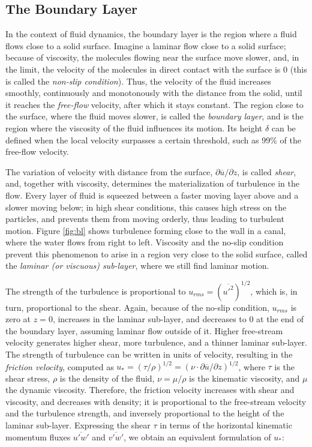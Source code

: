 \documentclass[a4paper,11pt]{kth-mag}
\begin{document}
\subsection{The Boundary Layer}
In the context of fluid dynamics, the boundary layer is the region where a fluid flows close to a solid surface. Imagine a laminar flow close to a solid surface; because of viscosity, the molecules flowing near the surface move slower, and, in the limit, the velocity of the molecules in direct contact with the surface is 0 (this is called the \emph{non-slip condition}). Thus, the velocity of the fluid increases smoothly, continuously and monotonously with the distance from the solid, until it reaches the \emph{free-flow} velocity, after which it stays constant. The region close to the surface, where the fluid moves slower, is called the \emph{boundary layer}, and is the region where the viscosity of the fluid influences its motion. Its height $\delta$ can be defined when the local velocity surpasses a certain threshold, such as 99\% of the free-flow velocity.

The variation of velocity with distance from the surface, $\partial\overline{u}/\partial z$, is called \emph{shear}, and, together with viscosity, determines the materialization of turbulence in the flow. Every layer of fluid is squeezed between a faster moving layer above and a slower moving below; in high shear conditions, this causes high stress on the particles, and prevents them from moving orderly, thus leading to turbulent motion. Figure \ref{fig:bl} shows turbulence forming close to the wall in a canal, where the water flows from right to left. Viscosity and the no-slip condition prevent this phenomenon to arise in a region very close to the solid surface, called the \emph{laminar (or viscuous) sub-layer}, where we still find laminar motion.

The strength of the turbulence is proportional to $u_{rms}=(\overline{u'^2})^{1/2}$, which is, in turn, proportional to the shear. Again, because of the no-slip condition, $u_{rms}$ is zero at $z=0$, increases in the laminar sub-layer, and decreases to 0 at the end of the boundary layer, assuming laminar flow outside of it. Higher free-stream velocity generates higher shear, more turbulence, and a thinner laminar sub-layer. The strength of turbulence can be written in units of velocity, resulting in the \emph{friction velocity}, computed as $u_*=(\tau/\rho)^{1/2}=(\nu\cdot\partial\overline{u}/\partial z)^{1/2}$, where $\tau$ is the shear stress, $\rho$ is the density of the fluid, $\nu=\mu/\rho$ is the kinematic viscosity, and $\mu$ the dynamic viscosity. Therefore, the friction velocity increases with shear and viscosity, and decreases with density; it is proportional to the free-stream velocity and the turbulence strength, and inversely proportional to the height of the laminar sub-layer. Expressing the shear $\tau$ in terms of the horizontal kinematic momentum fluxes $\overline{u'w'}$ and $\overline{v'w'}$, we obtain an equivalent formulation of $u_*$:
\end{document}
